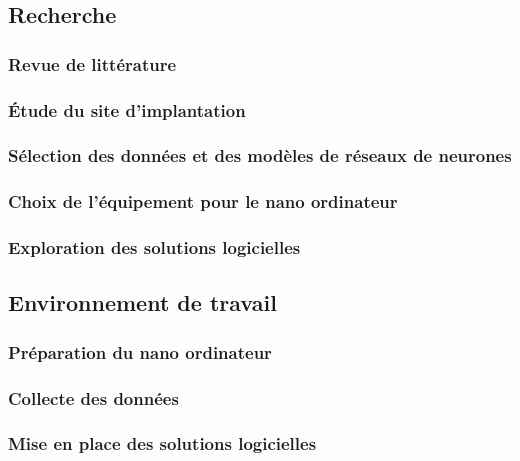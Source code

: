 \subsection{Recherche}

\subsubsection{Revue de littérature}

\subsubsection{Étude du site d'implantation}

\subsubsection{Sélection des données et des modèles de réseaux de neurones}

\subsubsection{Choix de l'équipement pour le nano ordinateur}

\subsubsection{Exploration des solutions logicielles}

\subsection{Environnement de travail}

\subsubsection{Préparation du nano ordinateur}

\subsubsection{Collecte des données}

\subsubsection{Mise en place des solutions logicielles}

